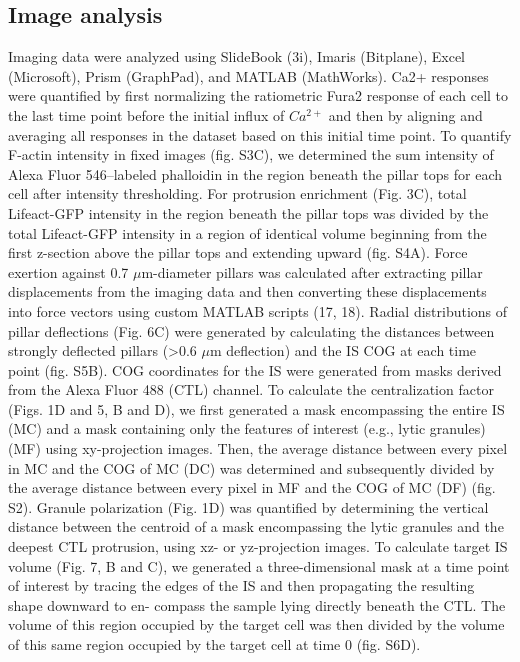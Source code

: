 \subsection{Image analysis}
Imaging data were analyzed using SlideBook (3i), Imaris (Bitplane), Excel (Microsoft), Prism (GraphPad), and MATLAB (MathWorks). Ca2+ responses were quantified by first normalizing the ratiometric Fura2 response of each cell to the last time point before the initial influx of $Ca^{2+}$ and then by aligning and averaging all responses in the dataset based on this initial time point. To quantify F-actin intensity in fixed images (fig. S3C), we determined the sum intensity of Alexa Fluor 546–labeled phalloidin in the region beneath the pillar tops for each cell after intensity thresholding. For protrusion enrichment (Fig. 3C), total Lifeact-GFP intensity in the region beneath the pillar tops was divided by the total Lifeact-GFP intensity in a region of identical volume beginning from the first z-section above the pillar tops and extending upward (fig. S4A). Force exertion against 0.7 $\mu$m-diameter pillars was calculated after extracting pillar displacements from the imaging data and then converting these displacements into force vectors using custom MATLAB scripts (17, 18). Radial distributions of pillar deflections (Fig. 6C) were generated by calculating the distances between strongly deflected pillars (>0.6 $\mu$m deflection) and the IS COG at each time point (fig. S5B). COG coordinates for the IS were generated from masks derived from the Alexa Fluor 488 (CTL) channel. To calculate the centralization factor (Figs. 1D and 5, B and D), we first generated a mask encompassing the entire IS (MC) and a mask containing only the features of interest (e.g., lytic granules) (MF) using xy-projection images. Then, the average distance between every pixel in MC and the COG of MC (DC) was determined and subsequently divided by the average distance between every pixel in MF and the COG of MC (DF) (fig. S2). Granule polarization (Fig. 1D) was quantified by determining the vertical distance between the centroid of a mask encompassing the lytic granules and the deepest CTL protrusion, using xz- or yz-projection images. To calculate target IS volume (Fig. 7, B and C), we generated a three-dimensional mask at a time point of interest by tracing the edges of the IS and then propagating the resulting shape downward to en- compass the sample lying directly beneath the CTL. The volume of this region occupied by the target cell was then divided by the volume of this same region occupied by the target cell at time 0 (fig. S6D).

